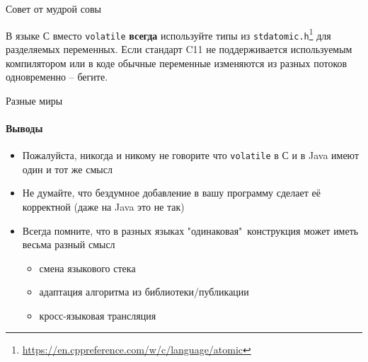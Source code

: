 \begin{frame}{Совет от мудрой совы}

В языке С вместо \texttt{volatile} \textbf{всегда} используйте типы из \texttt{stdatomic.h}\footnote{\tiny\url{https://en.cppreference.com/w/c/language/atomic}} для разделяемых переменных.
Если стандарт C11 не поддерживается используемым компилятором или в коде обычные переменные изменяются из разных потоков одновременно -- бегите.

\end{frame}



\begin{frame}[fragile]{Разные миры}
\framesubtitle{Выводы}

\begin{itemize}
 \item Пожалуйста, никогда и никому не говорите что \texttt{volatile} в С и в Java имеют один и тот же смысл
 \item Не думайте, что бездумное добавление  в вашу программу сделает её корректной (даже на Java это не так)
 \item Всегда помните, что в разных языках "одинаковая"\ конструкция может иметь весьма разный смысл
 \begin{itemize}
    \item смена языкового стека
    \item адаптация алгоритма из библиотеки/публикации
    \item кросс-языковая трансляция
 \end{itemize}
\end{itemize}
\end{frame}

